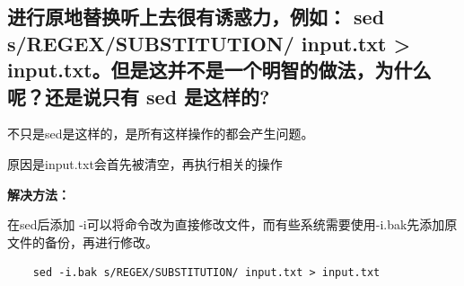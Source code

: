 \documentclass[UTF8,a4paper]{ctexart}
\begin{document}
\subsection{进行原地替换听上去很有诱惑力，例如： sed s/REGEX/SUBSTITUTION/ input.txt > input.txt。但是这并不是一个明智的做法，为什么呢？还是说只有 sed 是这样的?}
不只是sed是这样的，是所有这样操作的都会产生问题。\par
原因是input.txt会首先被清空，再执行相关的操作\par
\textbf{解决方法：}\par
在sed后添加 -i可以将命令改为直接修改文件，而有些系统需要使用-i.bak先添加原文件的备份，再进行修改。
\begin{lstlisting}
    sed -i.bak s/REGEX/SUBSTITUTION/ input.txt > input.txt
\end{lstlisting}
\end{document}
